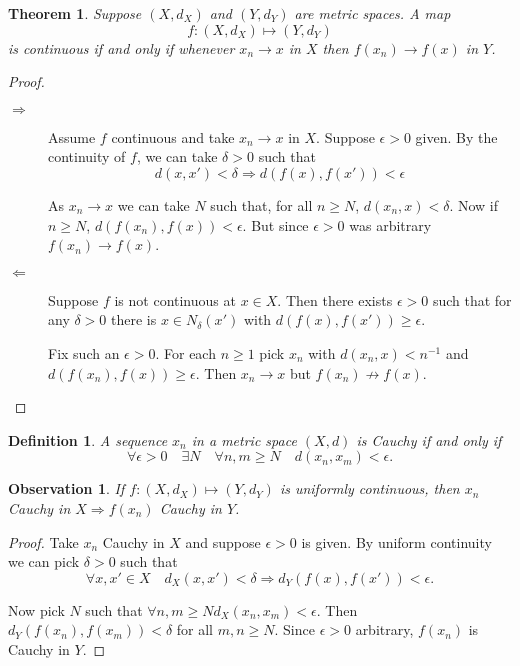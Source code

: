 \documentclass{notes}
\theoremstyle{plain}
\newtheorem{theorem}[proposition]{Theorem}
\newtheorem{observation}[proposition]{Observation}
\newtheorem{definition}[proposition]{Definition}
\newcommand{\Forall}[1]{\forall #1 \quad}
\newcommand{\Exists}[1]{\exists #1 \quad}
\begin{document}
\begin{theorem}
Suppose $ (X,d_{X}) $ and $ (Y,d_{Y}) $ are metric spaces.
A map
\[
f\colon (X,d_{X}) \mapsto (Y,d_{Y})
\]
is continuous if and only if whenever $ x_{n} \to x $ in $ X $ then $ 
f(x_{n}) \to f(x) $ in $ Y $.
\end{theorem}
\begin{proof}
\

\begin{description}

\item[$\Rightarrow$] Assume $ f $ continuous and take $ x_{n} \to x $ in $ X $.
Suppose $ \epsilon > 0 $ given. By the continuity of $ f $, we 
can take $ \delta>0 $ such that
\[ d(x,x') < \delta \Rightarrow d(f(x),f(x'))< \epsilon \]

As $ x_{n} \to x $ we can take $ N $ such that, for all
$ n\geq N $, $ d(x_{n},x)<\delta $.
Now if $ n \geq N $, $ d(f(x_{n}),f(x))<\epsilon $.
But since $ \epsilon>0 $ was arbitrary $ f(x_{n}) \to 
f(x) $.

\item[$\Leftarrow $] Suppose $ f $ is not continuous at $ x \in X $. Then 
there exists $ \epsilon>0 $ such that for any $ \delta>0 $ there 
is $ x\in N_{\delta}(x') $ with $d(f(x),f(x')) \geq \epsilon$.

Fix such an $ \epsilon>0 $.  For each $ n \geq 1 $ pick $ x_{n} $ with
$d(x_{n},x) < n^{-1}$ and 
$d(f(x_{n}),f(x)) \geq \epsilon$.
Then $ x_{n}\to x $ but $ f(x_{n}) \not \to f(x) $.
\end{description}
\end{proof}


\begin{definition}
A sequence $ x_{n} $ in a metric space $ (X,d) $
is \emph{Cauchy} if and only if
\[
\Forall{\epsilon>0} \Exists{N} \Forall{n,m \geq N} 
d(x_{n},x_{m})<\epsilon.
\]
\end{definition}

\begin{observation}
If $ f\colon (X,d_{X}) \mapsto (Y,d_{Y}) $ is uniformly continuous, 
then $ x_{n} $ Cauchy in $ X \Rightarrow f(x_{n}) $ Cauchy in $ Y $.
\end{observation}

\begin{proof}
Take $ x_{n}  $ Cauchy in $ X $ and suppose $ \epsilon>0 $ is given.
By uniform continuity we can pick $ \delta>0 $ such that
\[
\Forall{x,x'\in X} d_{X}(x,x')<\delta \Rightarrow
d_{Y}(f(x),f(x'))<\epsilon.
\]

Now pick $ N $ such that
$\forall n,m \geq N d_{X}(x_{n},x_{m})<\epsilon$.
Then $d_{Y}(f(x_{n}),f(x_{m}))< \delta$
for all $ m,n \geq N $.
Since $ \epsilon>0 $ arbitrary, $ f(x_{n}) $ is Cauchy 
in $ Y $.
\end{proof}
\end{document}
